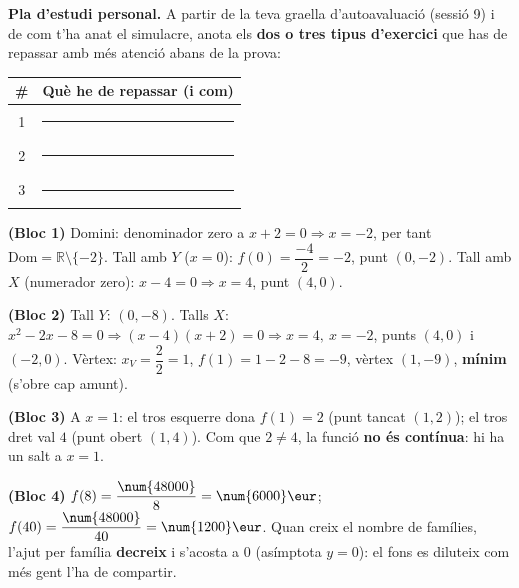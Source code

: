 \noindent\textbf{Pla d'estudi personal.} A partir de la teva graella
d'autoavaluació (sessió 9) i de com t'ha anat el simulacre, anota els \textbf{dos o
tres tipus d'exercici} que has de repassar amb més atenció abans de la prova:
\begin{center}
\renewcommand{\arraystretch}{1.5}
\begin{tabular}{c p{10.5cm}}
\toprule
\textbf{\#} & \textbf{Què he de repassar (i com)} \\
\midrule
1 & \rule{9.8cm}{0.4pt} \\
2 & \rule{9.8cm}{0.4pt} \\
3 & \rule{9.8cm}{0.4pt} \\
\bottomrule
\end{tabular}
\end{center}

\begin{solucions}
\begin{sollist}
  \item \textbf{(Bloc 1)} Domini: denominador zero a $x+2=0 \Rightarrow x=-2$, per
        tant $\mathrm{Dom}=\mathbb{R}\setminus\{-2\}$. Tall amb $Y$ ($x=0$):
        $f(0)=\dfrac{-4}{2}=-2$, punt $(0,-2)$. Tall amb $X$ (numerador zero):
        $x-4=0 \Rightarrow x=4$, punt $(4,0)$.
  \item \textbf{(Bloc 2)} Tall $Y$: $(0,-8)$. Talls $X$: $x^2-2x-8=0
        \Rightarrow (x-4)(x+2)=0 \Rightarrow x=4,\ x=-2$, punts $(4,0)$ i $(-2,0)$.
        Vèrtex: $x_V=\dfrac{2}{2}=1$, $f(1)=1-2-8=-9$, vèrtex $(1,-9)$, \textbf{mínim}
        (s'obre cap amunt).
  \item \textbf{(Bloc 3)} A $x=1$: el tros esquerre dona $f(1)=2$ (punt tancat
        $(1,2)$); el tros dret val $4$ (punt obert $(1,4)$). Com que $2\neq 4$, la
        funció \textbf{no és contínua}: hi ha un salt a $x=1$.
  \item \textbf{(Bloc 4)} $f(8)=\dfrac{\num{48000}}{8}=\num{6000}\eur$;
        $f(40)=\dfrac{\num{48000}}{40}=\num{1200}\eur$. Quan creix el nombre de
        famílies, l'ajut per família \textbf{decreix} i s'acosta a $0$ (asímptota
        $y=0$): el fons es diluteix com més gent l'ha de compartir.
\end{sollist}
\end{solucions}
